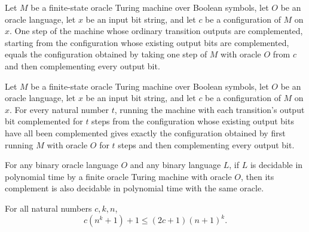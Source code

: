 \begin{theorem}
\label{Complexity.negOut_step}
\leanok
{}
Let $M$ be a finite-state oracle Turing machine over Boolean symbols, let $O$ be an
oracle language, let $x$ be an input bit string, and let $c$ be a configuration of $M$
on $x$. One step of the machine whose ordinary transition outputs are complemented,
starting from the configuration whose existing output bits are complemented, equals the
configuration obtained by taking one step of $M$ with oracle $O$ from $c$ and then
complementing every output bit.
\end{theorem}

\begin{theorem}
\label{Complexity.negOut_runFrom}
\leanok
{}
Let $M$ be a finite-state oracle Turing machine over Boolean symbols, let $O$ be an
oracle language, let $x$ be an input bit string, and let $c$ be a configuration of $M$
on $x$. For every natural number $t$, running the machine with each transition’s output
bit complemented for $t$ steps from the configuration whose existing output bits have
all been complemented gives exactly the configuration obtained by first running $M$ with
oracle $O$ for $t$ steps and then complementing every output bit.
\end{theorem}

\begin{theorem}
\label{Complexity.compl_mem_POracle}
\leanok
{}
For any binary oracle language $O$ and any binary language $L$, if $L$ is decidable in
polynomial time by a finite oracle Turing machine with oracle $O$, then its complement
is also decidable in polynomial time with the same oracle.
\end{theorem}

\begin{theorem}
\label{Complexity.b1_poly_succ_le}
\leanok
{}
For all natural numbers $c,k,n$,\[c(n^k+1)+1\le (2c+1)(n+1)^k.\]
\end{theorem}

